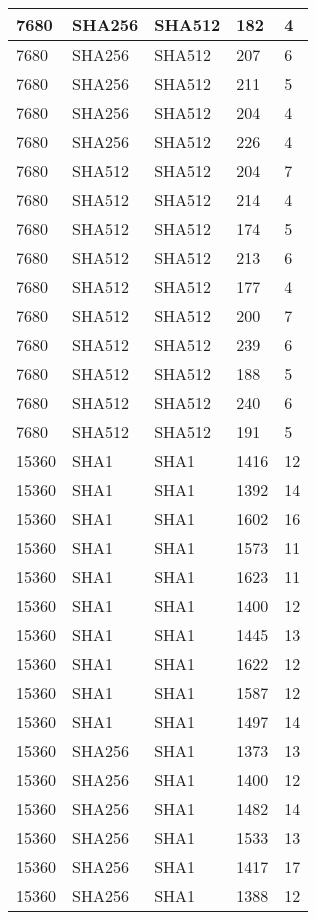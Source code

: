\begin{tabular}{| l | l | l | l | l |}
7680 & SHA256 & SHA512 & 182 & 4 \\ \hline 
7680 & SHA256 & SHA512 & 207 & 6 \\ \hline 
7680 & SHA256 & SHA512 & 211 & 5 \\ \hline 
7680 & SHA256 & SHA512 & 204 & 4 \\ \hline 
7680 & SHA256 & SHA512 & 226 & 4 \\ \hline 
7680 & SHA512 & SHA512 & 204 & 7 \\ \hline 
7680 & SHA512 & SHA512 & 214 & 4 \\ \hline 
7680 & SHA512 & SHA512 & 174 & 5 \\ \hline 
7680 & SHA512 & SHA512 & 213 & 6 \\ \hline 
7680 & SHA512 & SHA512 & 177 & 4 \\ \hline 
7680 & SHA512 & SHA512 & 200 & 7 \\ \hline 
7680 & SHA512 & SHA512 & 239 & 6 \\ \hline 
7680 & SHA512 & SHA512 & 188 & 5 \\ \hline 
7680 & SHA512 & SHA512 & 240 & 6 \\ \hline 
7680 & SHA512 & SHA512 & 191 & 5 \\ \hline 
15360 & SHA1 & SHA1 & 1416 & 12 \\ \hline 
15360 & SHA1 & SHA1 & 1392 & 14 \\ \hline 
15360 & SHA1 & SHA1 & 1602 & 16 \\ \hline 
15360 & SHA1 & SHA1 & 1573 & 11 \\ \hline 
15360 & SHA1 & SHA1 & 1623 & 11 \\ \hline 
15360 & SHA1 & SHA1 & 1400 & 12 \\ \hline 
15360 & SHA1 & SHA1 & 1445 & 13 \\ \hline 
15360 & SHA1 & SHA1 & 1622 & 12 \\ \hline 
15360 & SHA1 & SHA1 & 1587 & 12 \\ \hline 
15360 & SHA1 & SHA1 & 1497 & 14 \\ \hline 
15360 & SHA256 & SHA1 & 1373 & 13 \\ \hline 
15360 & SHA256 & SHA1 & 1400 & 12 \\ \hline 
15360 & SHA256 & SHA1 & 1482 & 14 \\ \hline 
15360 & SHA256 & SHA1 & 1533 & 13 \\ \hline 
15360 & SHA256 & SHA1 & 1417 & 17 \\ \hline 
15360 & SHA256 & SHA1 & 1388 & 12 \\ \hline 

\end{tabular}
